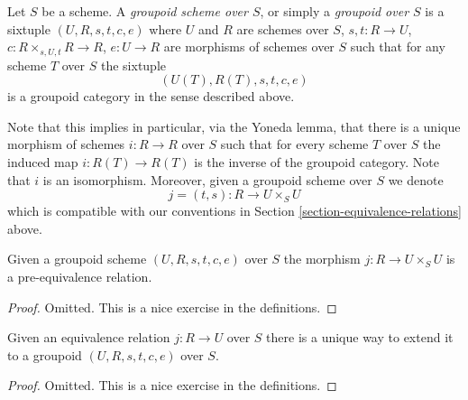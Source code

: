 \begin{definition}
\label{definition-groupoid}
Let $S$ be a scheme.
A {\it groupoid scheme over $S$}, or simply a
{\it groupoid over $S$} is a
sixtuple $(U, R, s, t, c, e)$ where
$U$ and $R$ are schemes over $S$,
$s, t : R \to U$, $c : R \times_{s, U, t} R \to R$,
$e : U \to R$ are morphisms
of schemes over $S$ such that for any scheme
$T$ over $S$ the sixtuple
$$
(U(T), R(T), s, t, c, e)
$$
is a groupoid category in the sense described above.
\end{definition}

\noindent
Note that this implies in particular, via the Yoneda lemma,
that there is a unique morphism of schemes
$i : R \to R$ over $S$ such that for every scheme $T$ over $S$
the induced map $i : R(T) \to R(T)$ is the inverse of
the groupoid category. Note that $i$ is an isomorphism.
Moreover, given a groupoid scheme over $S$ we denote
$$
j = (t, s) : R \longrightarrow U \times_S U
$$
which is compatible with our conventions in Section
\ref{section-equivalence-relations} above.

\begin{lemma}
\label{lemma-groupoid-pre-equivalence}
Given a groupoid scheme $(U, R, s, t, c, e)$ over $S$
the morphism $j : R \to U\times_S U$ is a pre-equivalence
relation.
\end{lemma}

\begin{proof}
Omitted.
This is a nice exercise in the definitions.
\end{proof}

\begin{lemma}
\label{lemma-equivalence-groupoid}
Given an equivalence relation $j : R \to U$ over $S$
there is a unique way to extend it to a groupoid
$(U, R, s, t, c, e)$ over $S$.
\end{lemma}

\begin{proof}
Omitted.
This is a nice exercise in the definitions.
\end{proof}































